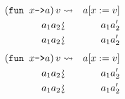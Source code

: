 \documentclass{beamer}
\newcommand{\assign}{:=}
\newcommand{\downsquigarrow}{{\mbox{\rotatebox[origin=c]{-90}{$\rightsquigarrow$}}}}
\newcommand{\tmverbatim}[1]{\text{{\ttfamily{#1}}}}
\begin{document}
{\hlstd{ \ \ \ \ \ \ \ \ \ \ \ \ \ \ \ \ }}{}{}{}{\hlendline{}}\\
{\hlstd{ \ \ \ \ \ \ \ \ \ \ \ \ \ \ }}{\hlopt{ \ \ \ \textbar }}{}{\hlopt{-> }}{}{\hlendline{}}\\
{\hlstd{ \ \ \ }}{\hlopt{ \ \ \ \ \ \ \ \ \ \ \ \ \ \ \textbar }}{}{\hlopt{(}}{}{\hlopt{, }}{}{\hlopt{) -> }}{}{\hlopt{+ }}{}{\hlopt{))}}{}{\hlopt{)}}
\begin{eqnarray*}
  \left( \text{\tmverbatim{fun }} x \text{\tmverbatim{->}} a \right) v &
  \rightsquigarrow & a [x \assign v]\\
  a_1 a_2 & \downsquigarrow & a_1 a_2'\\
  a_1 a_2 & \downsquigarrow & a_1 a_2'
\end{eqnarray*}
{\newpage}
\begin{eqnarray*}
  \left( \text{\tmverbatim{fun }} x \text{\tmverbatim{->}} a \right) v &
  \rightsquigarrow & a [x \assign v]\\
  a_1 a_2 & \downsquigarrow & a_1 a_2'\\
  a_1 a_2 & \downsquigarrow & a_1 a_2'
\end{eqnarray*}
{\hlstd{ \ }}{}{\hlopt{+ }}{\hlopt{(}}{}{\hlopt{+
}}{\hlopt{(}}{}{}{\hlopt{->}}{\hlendline{}}\\
{\hlstd{ \ \ \ \ \ \ \ \ \ \ \ \ }}{}{}{}{\hlendline{}}\\
{\hlstd{ \ \ \ \ \ \ \ \ \ \ \ \ \ \ }}{\hlopt{\textbar }}{}{\hlopt{-> }}{}{\hlendline{}}\\
{\hlstd{ \ \ \ }}{\hlopt{ \ \ \ \ \ \ \ \ \ \ \textbar }}{}{\hlopt{(}}{}{\hlopt{, }}{}{\hlopt{) -> }}{}{\hlopt{+ }}{\hlopt{(}}{}{\hlopt{(}}{}{}{\hlopt{->}}{\hlendline{}}\\
{\hlstd{ \ \ \ \ \ \ \ \ \ \ \ \ \ \ \ \ }}{}{}{}{\hlendline{}}\\
{\hlstd{ \ \ \ \ \ \ \ \ \ \ \ \ \ \ }}{\hlopt{ \ \ \ \textbar }}{}{\hlopt{-> }}{}{\hlendline{}}\\
{\hlstd{ \ \ \ }}{\hlopt{ \ \ \ \ \ \ \ \ \ \ \ \ \ \ \textbar }}{}{\hlopt{(}}{}{\hlopt{, }}{}{\hlopt{) -> }}{}{\hlopt{+ }}{}{\hlopt{))}}{}{\hlopt{)}}{}{\hlopt{)}}
\end{document}
